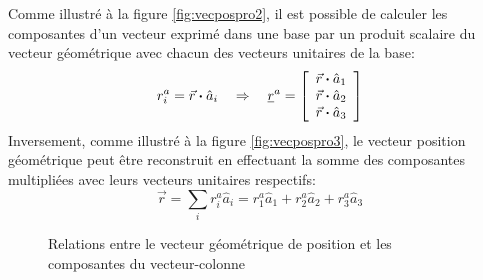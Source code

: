 Comme illustré à la figure \ref{fig:vecpospro2}, il est possible de calculer les composantes d'un vecteur exprimé dans une base par un produit scalaire du vecteur géométrique avec chacun des vecteurs unitaires de la base:
\begin{equation}
r_i^a = \vec{r} \boldsymbol{\cdot} \hat{a}_i  \quad \Rightarrow \quad 
\underline{r}^{a} = \left[ \begin{array}{c} \vec{r} \boldsymbol{\cdot} \hat{a}_1 \\ \vec{r} \boldsymbol{\cdot} \hat{a}_2 \\ \vec{r} \boldsymbol{\cdot} \hat{a}_3  \end{array} \right] 
\end{equation} 
Inversement, comme illustré à la figure \ref{fig:vecpospro3}, le vecteur position géométrique peut être reconstruit en effectuant la somme des composantes multipliées avec leurs vecteurs unitaires respectifs:
\begin{equation}
\vec{r} = \sum_{i} r_i^a \hat{a}_i = r_1^a \hat{a}_1 + r_2^a \hat{a}_2 + r_3^a \hat{a}_3%
\end{equation} 
\begin{figure}[htb]
        \centering
				\hspace{+20pt}
        \caption{Relations entre le vecteur géométrique de position et les composantes du vecteur-colonne}
				\label{fig:vecpospro23}
\end{figure}


